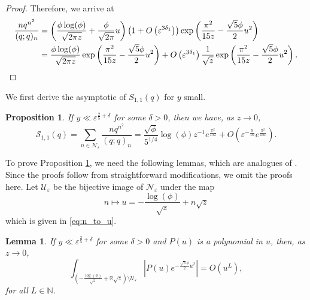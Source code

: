\documentclass[11pt,reqno]{amsart}
\newtheorem{lemma}[theorem]{Lemma}
\newtheorem{proposition}[theorem]{Proposition}
\theoremstyle{remark}
\numberwithin{equation}{section}
\begin{document}
\begin{proof}
Therefore, we arrive at
\begin{align*}
	\frac{n q^{n^2}}{(q;q)_n} &=  \left( \frac{\phi \log(\phi) }{\sqrt{2\pi z}} + \frac{\phi}{\sqrt{2\pi}} u\right)  \left(1+ O\left( \varepsilon^{3\delta_1}\right)\right)\exp \left( \frac{\pi^2}{15z} - \frac{\sqrt{5}\phi}{2}  u^2   \right)\\
	&=\frac{\phi \log(\phi) }{\sqrt{2\pi z}}\exp \left( \frac{\pi^2}{15z} - \frac{\sqrt{5}\phi}{2}  u^2   \right) + O\left( \varepsilon^{3\delta_1}\right) \frac{1}{\sqrt{z}} \exp \left( \frac{\pi^2}{15z} - \frac{\sqrt{5}\phi}{2}  u^2   \right). \qedhere
\end{align*}
\end{proof}


We first derive the asymptotic of $S_{1,1}(q)$ for $y$ small.

\begin{proposition}\label{prop:S11_narrow}
	If $y \ll \varepsilon^{\frac{2}{5}+\delta}$ for some $\delta>0$, then we have, as $z \to 0$, 
	\[
		\mathcal{S}_{1,1}(q) = \sum_{n \in \mathcal{N}_{\varepsilon}} \frac{nq^{n^2}}{(q;q)_n} = \frac{\sqrt{\phi} }{5^{1/4}}\log(\phi)  z^{-1} e^{\frac{\pi^2}{15 z}} + O\left(\varepsilon^{-\frac{9}{10}} e^{\frac{\pi^2}{15\varepsilon}}\right).
	\]
\end{proposition}
To prove Proposition \ref{prop:S11_narrow}, we need the following lemmas, which are analogues of  \cite[Lemmas 5.2 and 5.3]{BMRS}. Since the proofs follow from straightforward modifications, we omit the proofs here. Let $\mathcal{U}_{\varepsilon}$ be the bijective image of $\mathcal{N}_{\varepsilon}$ under the map
\[
	 n \mapsto u = - \frac{\log (\phi)}{\sqrt{z}} + n\sqrt{z}
\]
which is given in \eqref{eq:n_to_u}.

\begin{lemma}\label{lem:comp_U} 
	If $y \ll \varepsilon^{\frac{2}{5}+\delta}$ for some $\delta>0$ and $P(u)$ is a polynomial in $u$, then, as $z \to 0$, 
	\[
		 \int_{\left(-\frac{\log (\phi)}{\sqrt{z}} + \mathbb{R}\sqrt{z}\right) \setminus \mathcal{U}_{\varepsilon}} \left|P(u) e^{-\frac{\sqrt{5}\phi}{2}u^2} \right| = O\left(u^L\right),
	\]
	for all $L \in \mathbb{N}$.
\end{lemma}
\end{document}
